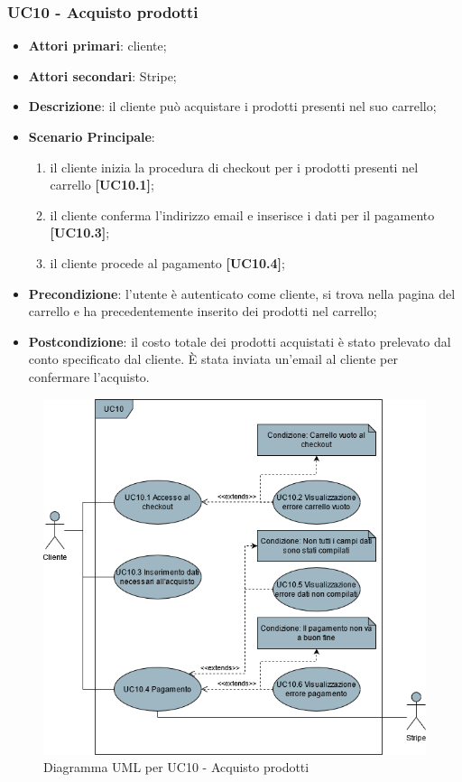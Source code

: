\subsubsection{UC10 - Acquisto prodotti}
\begin{itemize}
\item \textbf{Attori primari}: cliente;
\item \textbf{Attori secondari}: Stripe;
\item \textbf{Descrizione}: il cliente può acquistare i prodotti presenti nel suo carrello;
\item \textbf{Scenario Principale}: 
\begin{enumerate}
	\item il cliente inizia la procedura di checkout per i prodotti presenti nel carrello \textbf{[UC10.1]};
	\item il cliente conferma l'indirizzo email e inserisce i dati per il pagamento \textbf{[UC10.3]};
	\item il cliente procede al pagamento \textbf{[UC10.4]};
\end{enumerate}
\item \textbf{Precondizione}: l'utente è autenticato come cliente, si trova nella pagina del carrello e ha precedentemente inserito dei prodotti nel carrello;
\item \textbf{Postcondizione}: il costo totale dei prodotti acquistati è stato prelevato dal conto specificato dal cliente. È stata inviata un'email al cliente per confermare l'acquisto.
\end{itemize}

\begin{figure}[H]
\centering
\includegraphics[scale=0.6]{res/UseCase/Immagini/AcquistoProdotti}
\caption{Diagramma UML per UC10 - Acquisto prodotti}
\end{figure}

